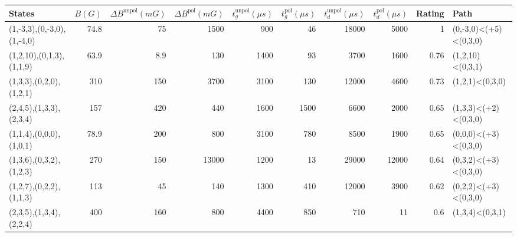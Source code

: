 \begin{tabular}{lrrrrrrrrl}
\hline
 {States}                   &   {$B(G)$} &   {$\Delta B^{\text{unpol}}(mG)$} &   {$\Delta B^{\text{pol}}(mG)$} &   {$t^{\text{unpol}}_{g}(\mu s)$} &   {$t^{\text{pol}}_{g}(\mu s)$} &   {$t^{\text{unpol}}_{d}(\mu s)$} &   {$t^{\text{pol}}_{d}(\mu s)$} &   {Rating} & {Path}                \\
\hline
 (1,-3,3),(0,-3,0),(1,-4,0) &       74.8 &                              75   &                            1500 &                               900 &                              46 &                             18000 &                            5000 &       1    & (0,-3,0)<(+5)<(0,3,0) \\
 (1,2,10),(0,1,3),(1,1,9)   &       63.9 &                               8.9 &                             130 &                              1400 &                              93 &                              3700 &                            1600 &       0.76 & (1,2,10)<(0,3,1)      \\
 (1,3,3),(0,2,0),(1,2,1)    &      310   &                             150   &                            3700 &                              3100 &                             130 &                             12000 &                            4600 &       0.73 & (1,2,1)<(0,3,0)       \\
 (2,4,5),(1,3,3),(2,3,4)    &      157   &                             420   &                             440 &                              1600 &                            1500 &                              6600 &                            2000 &       0.65 & (1,3,3)<(+2)<(0,3,0)  \\
 (1,1,4),(0,0,0),(1,0,1)    &       78.9 &                             200   &                             800 &                              3100 &                             780 &                              8500 &                            1900 &       0.65 & (0,0,0)<(+3)<(0,3,0)  \\
 (1,3,6),(0,3,2),(1,2,3)    &      270   &                             150   &                           13000 &                              1200 &                              13 &                             29000 &                           12000 &       0.64 & (0,3,2)<(+3)<(0,3,0)  \\
 (1,2,7),(0,2,2),(1,1,3)    &      113   &                              45   &                             140 &                              1300 &                             410 &                             12000 &                            3900 &       0.62 & (0,2,2)<(+3)<(0,3,0)  \\
 (2,3,5),(1,3,4),(2,2,4)    &      400   &                             160   &                             800 &                              4400 &                             850 &                               710 &                              11 &       0.6  & (1,3,4)<(0,3,1)       \\
\hline
\end{tabular}